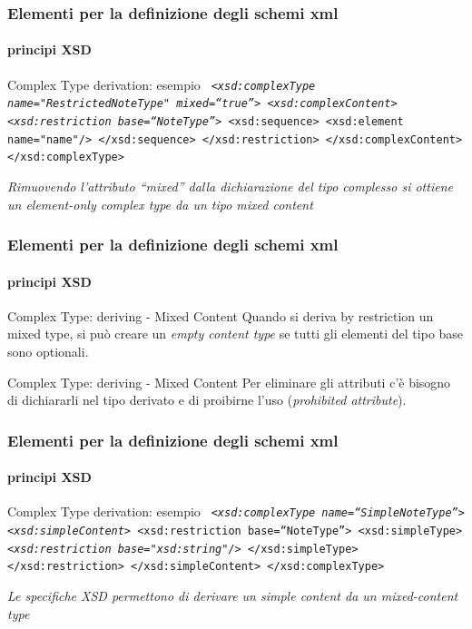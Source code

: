 \begin{frame}
	\frametitle{Elementi per la definizione degli schemi xml}
	\framesubtitle{principi XSD}
	\addtocounter{nframe}{1}

	\begin{block}{Complex Type derivation: esempio}
		\texttt{
			\emph{<xsd:complexType name="RestrictedNoteType" mixed=``true''>}
			\emph{<xsd:complexContent>}
			\emph{<xsd:restriction base=``NoteType''>}
			<xsd:sequence>
			<xsd:element name="name"/>
			</xsd:sequence>
			</xsd:restriction>
			</xsd:complexContent>
			</xsd:complexType>
		}
	\end{block}
	\textit{Rimuovendo l'attributo ``mixed'' dalla dichiarazione del tipo complesso si ottiene un element-only complex type da un tipo mixed content}
\end{frame}

\begin{frame}
	\frametitle{Elementi per la definizione degli schemi xml}
	\framesubtitle{principi XSD}
	\addtocounter{nframe}{1}
	\begin{block}{Complex Type: deriving - Mixed Content}
		Quando si deriva by restriction un mixed type, si può creare un \textit{empty content type} se tutti gli elementi del tipo base sono optionali. 
	\end{block}
	\begin{block}{Complex Type: deriving - Mixed Content}
		Per eliminare gli attributi c'è bisogno di dichiararli nel tipo derivato e di proibirne l'uso (\textit{prohibited attribute}).
	\end{block}
\end{frame}

\begin{frame}
	\frametitle{Elementi per la definizione degli schemi xml}
	\framesubtitle{principi XSD}
	\addtocounter{nframe}{1}

	\begin{block}{Complex Type derivation: esempio}
		\texttt{
			\emph{<xsd:complexType name=``SimpleNoteType''>}
			\emph{<xsd:simpleContent>}
			<xsd:restriction base=``NoteType''>
			<xsd:simpleType>
			\emph{<xsd:restriction base="xsd:string"/>}
			</xsd:simpleType>
			</xsd:restriction>
			</xsd:simpleContent>
			</xsd:complexType>
		}
	\end{block}
	\textit{Le specifiche XSD permettono di derivare un simple content da un mixed-content type}
\end{frame}

